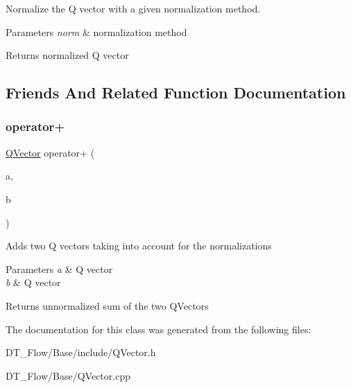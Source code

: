 Normalize the Q vector with a given normalization method. 
\begin{DoxyParams}{Parameters}
{\em norm} & normalization method \\
\hline
\end{DoxyParams}
\begin{DoxyReturn}{Returns}
normalized Q vector 
\end{DoxyReturn}


\subsection{Friends And Related Function Documentation}
\mbox{\label{classQn_1_1QVector_a49ad89498e27ff1c0f1a4bff592cb3b8}} 
\subsubsection{\texorpdfstring{operator+}{operator+}}
{\footnotesize\ttfamily \mbox{\hyperlink{classQn_1_1QVector}{Q\+Vector}} operator+ (\begin{DoxyParamCaption}\item[{\mbox{\hyperlink{classQn_1_1QVector}{Q\+Vector}}}]{a,  }\item[{\mbox{\hyperlink{classQn_1_1QVector}{Q\+Vector}}}]{b }\end{DoxyParamCaption})\hspace{0.3cm}{\ttfamily [friend]}}

Adds two Q vectors taking into account for the normalizations 
\begin{DoxyParams}{Parameters}
{\em a} & Q vector \\
\hline
{\em b} & Q vector \\
\hline
\end{DoxyParams}
\begin{DoxyReturn}{Returns}
unnormalized sum of the two Q\+Vectors 
\end{DoxyReturn}


The documentation for this class was generated from the following files\+:\begin{DoxyCompactItemize}
\item 
D\+T\+\_\+\+Flow/\+Base/include/Q\+Vector.\+h\item 
D\+T\+\_\+\+Flow/\+Base/Q\+Vector.\+cpp\end{DoxyCompactItemize}
